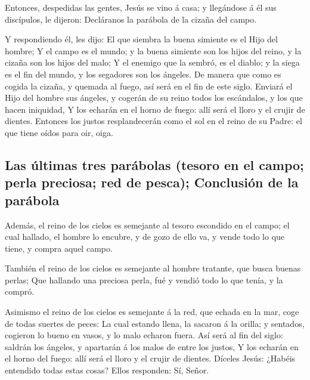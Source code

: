  Entonces, despedidas las gentes, Jesús se vino á casa; y
llegándose á él sus discípulos, le dijeron: Decláranos la parábola de la
cizaña del campo.

 Y respondiendo él, les dijo: El que siembra la buena
simiente es el Hijo del hombre;  Y el campo es el mundo; y
la buena simiente son los hijos del reino, y la cizaña son los hijos del
malo;  Y el enemigo que la sembró, es el diablo; y la siega
es el fin del mundo, y los segadores son los ángeles.  De
manera que como es cogida la cizaña, y quemada al fuego, así será en el
fin de este siglo.  Enviará el Hijo del hombre sus ángeles,
y cogerán de su reino todos los escándalos, y los que hacen iniquidad,
 Y los echarán en el horno de fuego: allí será el lloro y
el crujir de dientes.  Entonces los justos resplandecerán
como el sol en el reino de su Padre: el que tiene oídos para oir, oiga.

\hypertarget{las-uxfaltimas-tres-paruxe1bolas-tesoro-en-el-campo-perla-preciosa-red-de-pesca-conclusiuxf3n-de-la-paruxe1bola}{%
\subsection{Las últimas tres parábolas (tesoro en el campo; perla
preciosa; red de pesca); Conclusión de la
parábola}\label{las-uxfaltimas-tres-paruxe1bolas-tesoro-en-el-campo-perla-preciosa-red-de-pesca-conclusiuxf3n-de-la-paruxe1bola}}

 Además, el reino de los cielos es semejante al tesoro
escondido en el campo; el cual hallado, el hombre lo encubre, y de gozo
de ello va, y vende todo lo que tiene, y compra aquel campo.

 También el reino de los cielos es semejante al hombre
tratante, que busca buenas perlas;  Que hallando una
preciosa perla, fué y vendió todo lo que tenía, y la compró.

 Asimismo el reino de los cielos es semejante á la red, que
echada en la mar, coge de todas suertes de peces:  La cual
estando llena, la sacaron á la orilla; y sentados, cogieron lo bueno en
vasos, y lo malo echaron fuera.  Así será al fin del siglo:
saldrán los ángeles, y apartarán á los malos de entre los justos,
 Y los echarán en el horno del fuego: allí será el lloro y
el crujir de dientes.  Díceles Jesús: ¿Habéis entendido
todas estas cosas? Ellos responden: Sí, Señor.

